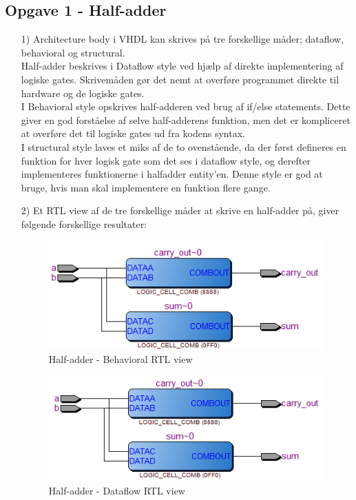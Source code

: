 \subsection{Opgave 1 - Half-adder}
\begin{enumerate}
	\item[1)]
	Architecture body i VHDL kan skrives på tre forskellige måder; dataflow, behavioral og structural. \\
	Half-adder beskrives i Dataflow style ved hjælp af direkte implementering af logiske gates. Skrivemåden gør det nemt at overføre programmet direkte til hardware og de logiske gates. \\
	I Behavioral style opskrives half-adderen ved brug af if/else statements. Dette giver en god forståelse af selve half-adderens funktion, men det er kompliceret at overføre det til logiske gates ud fra kodens syntax. \\
	I structural style laves et miks af de to ovenstående, da der først defineres en funktion for hver logisk gate som det ses i dataflow style, og derefter implementeres funktionerne i halfadder entity’en. Denne style er god at bruge, hvis man skal implementere en funktion flere gange.\\
	\item[2)]
	Et RTL view af de tre forskellige måder at skrive en half-adder på, giver følgende forskellige resultater:\\
\begin{figure}[h]
	\centering
\includegraphics[scale=0.8]{pictures/Oevelse1/Half_adder/Behavioral.JPG}
\caption{Half-adder - Behavioral RTL view}
\label{fig:HaBehavioralRTL}
\end{figure}

\begin{figure}[h]
	\centering
	\includegraphics[scale=0.8]{pictures/Oevelse1/Half_adder/dataflow.JPG}
	\caption{Half-adder - Dataflow RTL view}
	\label{fig:HaDataflowRTL}
\end{figure}


\end{enumerate}
